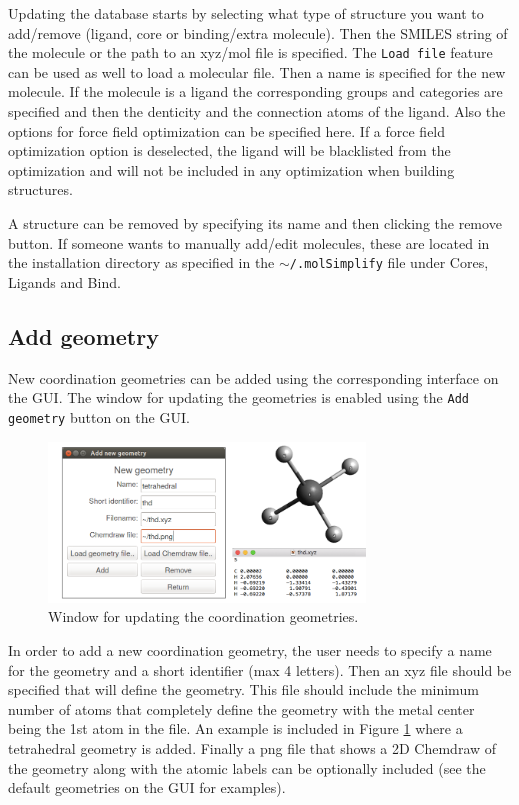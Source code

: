 \documentclass[a4paper,12pt]{assignment}
\begin{document}
Updating the database starts by selecting what type of structure you want to add/remove (ligand, core or binding/extra molecule). Then the SMILES string of the molecule or the path to an xyz/mol file is specified. The \texttt{Load file} feature can be used as well to load a molecular file. Then a name is specified for the new molecule. If the molecule is a ligand the corresponding groups and categories are specified and then the denticity and the connection atoms of the ligand. Also the options for force field optimization can be specified here. If a force field optimization option is deselected, the ligand will be blacklisted from the optimization and will not be included in any optimization when building structures. 

A structure can be removed by specifying its name and then clicking the remove button. If someone wants to manually add/edit molecules, these are located in the installation directory as specified in the \texttt{$\sim$/.molSimplify} file under Cores, Ligands and Bind.

\subsection{Add geometry}

New coordination geometries can be added using the corresponding interface on the GUI. The window for updating the geometries is enabled using the \texttt{Add geometry} button on the GUI.

\begin{figure}[htb!]
\centering
\includegraphics[width=0.75\textwidth]{./Figures/fig18.png}
\caption{Window for updating the coordination geometries.}
\label{lg}
\end{figure}

In order to add a new coordination geometry, the user needs to specify a name for the geometry and a short identifier (max 4 letters). Then an xyz file should be specified that will define the geometry. This file should include the minimum number of atoms that completely define the geometry with the metal center being the 1st atom in the file. An example is included in Figure \ref{lg} where a tetrahedral geometry is added. Finally a png file that shows a 2D Chemdraw of the geometry along with the atomic labels can be optionally included (see the default geometries on the GUI for examples).
\end{document}
